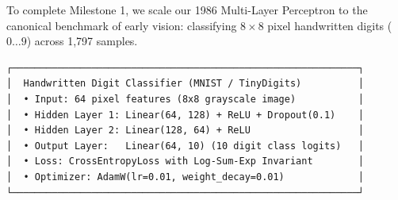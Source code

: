 \documentclass[
  letterpaper,
]{scrbook}
\begin{document}

To complete Milestone 1, we scale our 1986 Multi-Layer Perceptron to the
canonical benchmark of early vision: classifying \(8 \times 8\) pixel
handwritten digits (\(0 \dots 9\)) across 1,797 samples.

\begin{verbatim}
┌─────────────────────────────────────────────────────────────┐
│  Handwritten Digit Classifier (MNIST / TinyDigits)          │
│  • Input: 64 pixel features (8x8 grayscale image)           │
│  • Hidden Layer 1: Linear(64, 128) + ReLU + Dropout(0.1)    │
│  • Hidden Layer 2: Linear(128, 64) + ReLU                   │
│  • Output Layer:   Linear(64, 10) (10 digit class logits)   │
│  • Loss: CrossEntropyLoss with Log-Sum-Exp Invariant        │
│  • Optimizer: AdamW(lr=0.01, weight_decay=0.01)             │
└─────────────────────────────────────────────────────────────┘
\end{verbatim}
\end{document}
